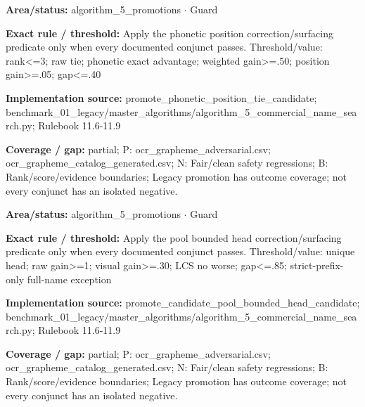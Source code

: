 \begin{tcolorbox}[enhanced,breakable,colback=white,colframe=Muted!45,boxrule=0.45pt,arc=1.5pt,left=6pt,right=6pt,top=5pt,bottom=5pt,title={\texttt{A5-PROMOTE-PHONETIC-POSITION}},title after break={\texttt{A5-PROMOTE-PHONETIC-POSITION}\ (continued)},fonttitle=\headingfont\bfseries\color{Navy},coltitle=Navy]
\textbf{Area/status:} algorithm\_\allowbreak{}5\_\allowbreak{}promotions $\boldsymbol{\cdot}$ Guard\par
\smallskip
\textbf{Exact rule / threshold:} Apply the phonetic position correction/\allowbreak{}surfacing predicate only when every documented conjunct passes. Threshold/\allowbreak{}value: rank<=3; raw tie; phonetic exact advantage; weighted gain>=.50; position gain>=.05; gap<=.40\par
\smallskip
\textbf{Implementation source:} promote\_\allowbreak{}phonetic\_\allowbreak{}position\_\allowbreak{}tie\_\allowbreak{}candidate; benchmark\_\allowbreak{}01\_\allowbreak{}legacy/\allowbreak{}master\_\allowbreak{}algorithms/\allowbreak{}algorithm\_\allowbreak{}5\_\allowbreak{}commercial\_\allowbreak{}name\_\allowbreak{}search.py; Rulebook 11.6-11.9\par
\smallskip
\textbf{Coverage / gap:} partial; P: ocr\_\allowbreak{}grapheme\_\allowbreak{}adversarial.csv; ocr\_\allowbreak{}grapheme\_\allowbreak{}catalog\_\allowbreak{}generated.csv; N: Fair/\allowbreak{}clean safety regressions; B: Rank/\allowbreak{}score/\allowbreak{}evidence boundaries; Legacy promotion has outcome coverage; not every conjunct has an isolated negative.
\end{tcolorbox}
\begin{tcolorbox}[enhanced,breakable,colback=white,colframe=Muted!45,boxrule=0.45pt,arc=1.5pt,left=6pt,right=6pt,top=5pt,bottom=5pt,title={\texttt{A5-PROMOTE-POOL-BOUNDED-HEAD}},title after break={\texttt{A5-PROMOTE-POOL-BOUNDED-HEAD}\ (continued)},fonttitle=\headingfont\bfseries\color{Navy},coltitle=Navy]
\textbf{Area/status:} algorithm\_\allowbreak{}5\_\allowbreak{}promotions $\boldsymbol{\cdot}$ Guard\par
\smallskip
\textbf{Exact rule / threshold:} Apply the pool bounded head correction/\allowbreak{}surfacing predicate only when every documented conjunct passes. Threshold/\allowbreak{}value: unique head; raw gain>=1; visual gain>=.30; LCS no worse; gap<=.85; strict-prefix-only full-name exception\par
\smallskip
\textbf{Implementation source:} promote\_\allowbreak{}candidate\_\allowbreak{}pool\_\allowbreak{}bounded\_\allowbreak{}head\_\allowbreak{}candidate; benchmark\_\allowbreak{}01\_\allowbreak{}legacy/\allowbreak{}master\_\allowbreak{}algorithms/\allowbreak{}algorithm\_\allowbreak{}5\_\allowbreak{}commercial\_\allowbreak{}name\_\allowbreak{}search.py; Rulebook 11.6-11.9\par
\smallskip
\textbf{Coverage / gap:} partial; P: ocr\_\allowbreak{}grapheme\_\allowbreak{}adversarial.csv; ocr\_\allowbreak{}grapheme\_\allowbreak{}catalog\_\allowbreak{}generated.csv; N: Fair/\allowbreak{}clean safety regressions; B: Rank/\allowbreak{}score/\allowbreak{}evidence boundaries; Legacy promotion has outcome coverage; not every conjunct has an isolated negative.
\end{tcolorbox}
